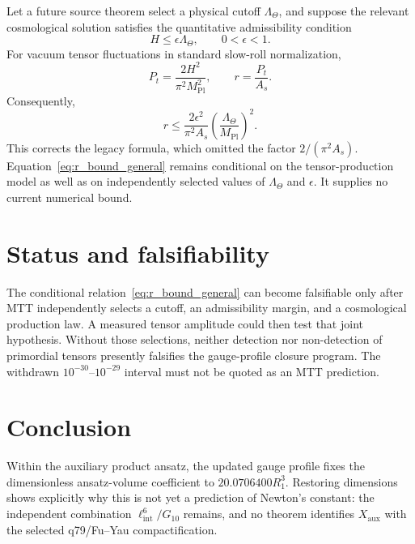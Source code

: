 \documentclass[11pt]{article}
\begin{document}
Let a future source theorem select a physical cutoff $\Lambda_\Theta$, and
suppose the relevant cosmological solution satisfies the quantitative
admissibility condition
\begin{equation}
H\leq\epsilon\Lambda_\Theta,
\qquad 0<\epsilon<1.
\label{eq:admissibility_H}
\end{equation}
For vacuum tensor fluctuations in standard slow-roll normalization,
\begin{equation}
P_t=\frac{2H^2}{\pi^2M_{\mathrm{Pl}}^2},
\qquad r=\frac{P_t}{A_s}.
\end{equation}
Consequently,
\begin{equation}
\boxed{r\leq
\frac{2\epsilon^2}{\pi^2A_s}
\left(\frac{\Lambda_\Theta}{M_{\mathrm{Pl}}}\right)^2.}
\label{eq:r_bound_general}
\end{equation}
This corrects the legacy formula, which omitted the factor
$2/(\pi^2A_s)$. Equation~\eqref{eq:r_bound_general} remains conditional on the
tensor-production model as well as on independently selected values of
$\Lambda_\Theta$ and $\epsilon$. It supplies no current numerical bound.


\section{Status and falsifiability}

The conditional relation~\eqref{eq:r_bound_general} can become falsifiable
only after MTT independently selects a cutoff, an admissibility margin, and a
cosmological production law. A measured tensor amplitude could then test that
joint hypothesis. Without those selections, neither detection nor
non-detection of primordial tensors presently falsifies the gauge-profile
closure program. The withdrawn $10^{-30}$--$10^{-29}$ interval must not be
quoted as an MTT prediction.


\section{Conclusion}

Within the auxiliary product ansatz, the updated gauge profile fixes the
dimensionless ansatz-volume coefficient to
$20.0706400R_1^3$. Restoring dimensions shows explicitly why this is not yet a
prediction of Newton's constant: the independent combination
$\ell_{\mathrm{int}}^6/G_{10}$ remains, and no theorem identifies
$X_{\mathrm{aux}}$ with the selected q79/Fu--Yau compactification.
\end{document}
